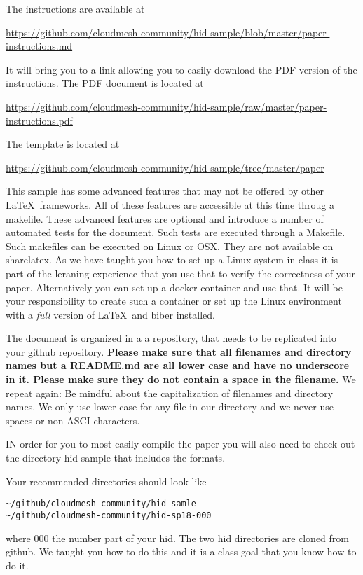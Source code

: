 The instructions are available at 

\url{https://github.com/cloudmesh-community/hid-sample/blob/master/paper-instructions.md}

It will bring you to a link allowing you to easily download the PDF
version of the instructions. The PDF document is located at 

\url{https://github.com/cloudmesh-community/hid-sample/raw/master/paper-instructions.pdf}


The template is located at

\url{https://github.com/cloudmesh-community/hid-sample/tree/master/paper}


This sample has some advanced features that may not be offered by
other \LaTeX\ frameworks. All of these features are accessible at this
time throug a makefile. These advanced features are optional and
introduce a number of automated tests for the document. Such tests are
executed through a Makefile. Such makefiles can be executed on Linux
or OSX. They are not available on sharelatex. As we have taught you
how to set up a Linux system in class it is part of the leraning
experience that you use that to verify the correctness of your
paper. Alternatively you can set up a docker container and use
that. It will be your responsibility to create such a container or set
up the Linux environment with a \textit{full} version of \LaTeX\ and biber
installed.

The document is organized in a a repository, that needs to be
replicated into your github repository. {\bf Please make sure that all
  filenames and directory names but a README.md are all lower case and
  have no underscore in it. Please make sure they do not contain a
  space in the filename.} We repeat again: Be mindful about the
capitalization of filenames and directory names. We only use lower
case for any file in our directory and we never use spaces or non ASCI
characters. 

IN order for you to most easily compile the paper you will also need
to check out the directory hid-sample that includes the formats. 

Your recommended directories should look like

\begin{verbatim}
~/github/cloudmesh-community/hid-samle
~/github/cloudmesh-community/hid-sp18-000
\end{verbatim}

where 000 the number part of your hid. The two hid directories are
cloned from github. We taught you how to do this and it is a class
goal that you know how to do it. 

